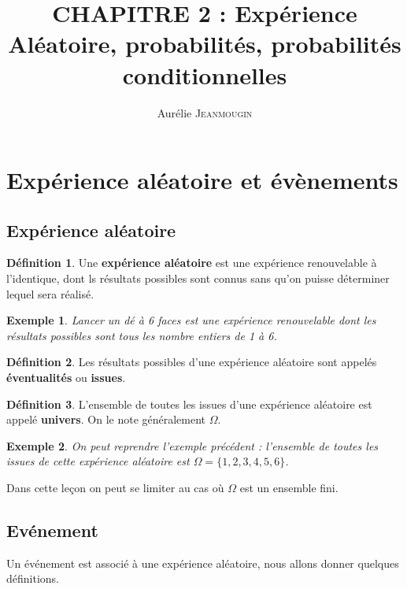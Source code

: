 \documentclass[a4paper,12pt,final]{article}
\title{CHAPITRE 2 : Expérience Aléatoire, probabilités, probabilités conditionnelles}
\author{Aurélie \textsc{Jeanmougin}}
\newtheorem{Ex}{Exemple}[section]
\theoremstyle{theorem}
\theoremstyle{definition}
\theoremstyle{definition}
\theoremstyle{definition}
\newtheorem{Def}{Définition}[section]
\begin{document}
	
	\maketitle

\section{Expérience aléatoire et évènements}
	\subsection{Expérience aléatoire}
		\begin{Def}
			Une \textbf{expérience aléatoire} est une expérience renouvelable à l'identique, dont ls résultats possibles sont connus sans qu'on puisse déterminer lequel sera réalisé.
		\end{Def}
	
		\begin{Ex}
			Lancer un dé à 6 faces est une expérience renouvelable dont les résultats possibles sont tous les nombre entiers de 1 à 6.
		\end{Ex}
	
		\begin{Def}
			Les résultats possibles d'une expérience aléatoire sont appelés \textbf{éventualités} ou \textbf{issues}.
		\end{Def}
	
		\begin{Def}
			L'ensemble de toutes les issues d'une expérience aléatoire est appelé \textbf{univers}. On le note généralement $\Omega$.
		\end{Def}
		
		\begin{Ex}
			On peut reprendre l'exemple précédent : l'ensemble de toutes les issues de cette expérience aléatoire est $\Omega = \{1,2,3,4,5,6\}$.
		\end{Ex}
	
	Dans cette leçon on peut se limiter au cas où $\Omega$ est un ensemble fini.
	
	\subsection{Evénement}
		
		Un événement est associé à une expérience aléatoire, nous allons donner quelques définitions.
		
\end{document}

